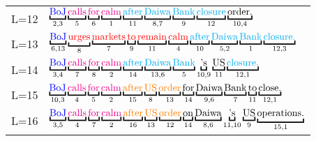 \documentclass[11pt]{article}
\begin{document}
\begin{table}[t]
\begin{fontpbk}
\begin{scriptsize}
\begin{tabular}{l|l}
L=12 & $\underbracket{\mbox{\textcolor{blue}{BoJ}}}_{2,3} \underbracket{\mbox{\textcolor{magenta}{calls}}}_{5} \underbracket{\mbox{\textcolor{magenta}{for}}}_{6} \underbracket{\mbox{\textcolor{magenta}{calm}}}_{1} \underbracket{\mbox{\textcolor{cyan}{after}}}_{11} \underbracket{\mbox{\textcolor{cyan}{Daiwa}}}_{8,7} \underbracket{\mbox{\textcolor{cyan}{Bank}}}_{9} \underbracket{\mbox{\textcolor{cyan}{closure}}}_{12} \underbracket{\mbox{order.}}_{10,4}$\\
L=13 & $\underbracket{\mbox{\textcolor{blue}{BoJ}}}_{6,13} \underbracket{\mbox{\textcolor{red}{urges}}}_{8} \underbracket{\mbox{\textcolor{red}{markets}}}_{7} \underbracket{\mbox{\textcolor{red}{to}}}_{9} \underbracket{\mbox{\textcolor{red}{remain}}}_{11} \underbracket{\mbox{\textcolor{red}{calm}}}_{4} \underbracket{\mbox{\textcolor{cyan}{after}}}_{10} \underbracket{\mbox{\textcolor{cyan}{Daiwa}}}_{5,2} \underbracket{\mbox{\textcolor{cyan}{Bank}}}_{1} \underbracket{\mbox{\textcolor{cyan}{closure.}}}_{12,3}$\\
L=14 & $\underbracket{\mbox{\textcolor{blue}{BoJ}}}_{3,4} \underbracket{\mbox{\textcolor{magenta}{calls}}}_{7} \underbracket{\mbox{\textcolor{magenta}{for}}}_{8} \underbracket{\mbox{\textcolor{magenta}{calm}}}_{2} \underbracket{\mbox{\textcolor{cyan}{after}}}_{14} \underbracket{\mbox{\textcolor{cyan}{Daiwa}}}_{13,6} \underbracket{\mbox{\textcolor{cyan}{Bank}}}_{5} \underbracket{\mbox{'s}}_{10,9} \underbracket{\mbox{US}}_{11} \underbracket{\mbox{\textcolor{cyan}{closure.}}}_{12,1}$\\
L=15 & $\underbracket{\mbox{\textcolor{blue}{BoJ}}}_{10,3} \underbracket{\mbox{\textcolor{magenta}{calls}}}_{4} \underbracket{\mbox{\textcolor{magenta}{for}}}_{5} \underbracket{\mbox{\textcolor{magenta}{calm}}}_{2} \underbracket{\mbox{\textcolor{orange}{after}}}_{15} \underbracket{\mbox{\textcolor{orange}{US}}}_{8} \underbracket{\mbox{\textcolor{orange}{order}}}_{13} \underbracket{\mbox{for}}_{14} \underbracket{\mbox{Daiwa}}_{9,6} \underbracket{\mbox{Bank}}_{7} \underbracket{\mbox{to}}_{11} \underbracket{\mbox{close.}}_{12,1}$\\
L=16 & $\underbracket{\mbox{\textcolor{blue}{BoJ}}}_{3,5} \underbracket{\mbox{\textcolor{magenta}{calls}}}_{4} \underbracket{\mbox{\textcolor{magenta}{for}}}_{7} \underbracket{\mbox{\textcolor{magenta}{calm}}}_{2} \underbracket{\mbox{\textcolor{orange}{after}}}_{16} \underbracket{\mbox{\textcolor{orange}{US}}}_{13} \underbracket{\mbox{\textcolor{orange}{order}}}_{12} \underbracket{\mbox{on}}_{14} \underbracket{\mbox{Daiwa}}_{8,6} \underbracket{\mbox{'s}}_{11,10} \underbracket{\mbox{US}}_{9} \underbracket{\mbox{operations.}}_{15,1}$\\

\end{tabular}
\end{scriptsize}
\end{fontpbk}
\end{table}
\end{document}
